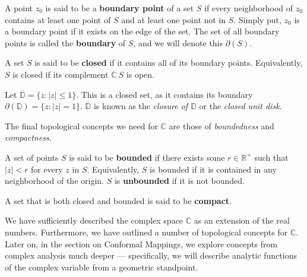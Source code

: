 \begin{defn}
A point $z_0$ is said to be a \textbf{boundary point} of a set $S$ if every neighborhood of $z_0$ contains at least one point of $S$ and at least one point not in $S$.  Simply put, $z_0$ is a boundary point if it exists on the edge of the set.  The set of all boundary points is called the \textbf{boundary} of $S$, and we will denote this $\partial(S)$.
\end{defn}

\begin{defn}
A set $S$ is said to be \textbf{closed} if it contains all of its boundary points.  Equivalently, $S$ is closed if its complement $\mathbb{C} \ S$ is open.
\end{defn}

\begin{example}
Let $\overbar{\mathbb{D}} = \{z : |z| \leq 1\}$.  This is a closed set, as it contains its boundary $\partial(\mathbb{D}) = \{z : |z| = 1\}$.  $\overbar{\mathbb{D}}$ is known as the \textit{closure of $\mathbb{D}$} or the \textit{closed unit disk}.
\end{example}

The final topological concepts we need for $\mathbb{C}$ are those of \textit{boundedness} and \textit{compactness}.

\begin{defn}
A set of points $S$ is said to be \textbf{bounded} if there exists some $r \in \mathbb{R}^+$ such that $|z| < r$ for every $z$ in $S$.  Equivalently, $S$ is bounded if it is contained in any neighborhood of the origin.  $S$ is \textbf{unbounded} if it is not bounded.
\end{defn}

\begin{defn}
A set that is both closed and bounded is said to be \textbf{compact}.
\end{defn}

We have sufficiently described the complex space $\mathbb{C}$ as an extension of the real numbers.  Furthermore, we have outlined a number of topological concepts for $\mathbb{C}$.  Later on, in the section on Conformal Mappings, we explore concepts from complex analysis much deeper --- specifically, we will describe analytic functions of the complex variable from a geometric standpoint.